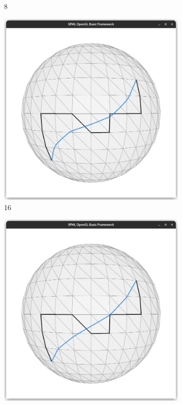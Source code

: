 \documentclass{stdlocal}
\begin{document}
\begin{figure}
\begin{subfigure}[b]{0.24\linewidth}
    \caption{8}
  \end{subfigure}
  \begin{subfigure}[b]{0.24\linewidth}
    \centering
    \includegraphics[width=\linewidth,trim={15px 20 15 50},clip]{images/sphere-geodesic-1-iteration-16.png}
    \caption{16}
  \end{subfigure}
  \begin{subfigure}[b]{0.24\linewidth}
    \centering
    \includegraphics[width=\linewidth,trim={15px 20 15 50},clip]{images/sphere-geodesic-1-iteration-32.png}

\end{subfigure}
\end{figure}
\end{document}
